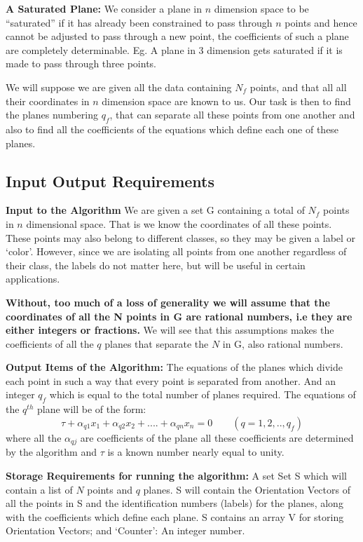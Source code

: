 \documentclass[english]{article}
\begin{document}
\textbf{A Saturated Plane:} We consider a plane in $n$ dimension
space to be {}``saturated'' if it has already been constrained to
pass through $n$ points and hence cannot be adjusted to pass through
a new point, the coefficients of such a plane are completely determinable.
Eg. A plane in 3 dimension gets saturated if it is made to pass through
three points.

We will suppose we are given all the data containing $N_{f}$ points, and that all 
all their coordinates in $n$ dimension space are known to us. Our task is then to find the planes numbering $q_f$, that can separate all these points from one another and also to find all the coefficients of the equations which define each one of these planes.

\subsection{Input Output Requirements}

\textbf{Input to the Algorithm} We are given a set G containing a
total of $N_{f}$ points in $n$ dimensional space. That is we know
the coordinates of all these points. These points may also belong
to different classes, so they may be given a label or `color'. However,
since we are isolating all points from one another regardless of their
class, the labels do not matter here, but will be useful in certain
applications.


\textbf{Without, too much of a loss of generality we will assume that the coordinates of all the N points in G are rational numbers, i.e they are either integers or fractions.} We will see that this assumptions makes the coefficients of  all the $q$ planes that separate the $N$ in G, also rational numbers. 

\textbf{Output Items of the Algorithm:} The equations of the planes
which divide each point in such a way that every point is separated
from another. And an integer $q_{f}$ which is equal to the
total number of planes required. The equations of the $q^{th}$ plane will be of the form:
\begin{equation}
\tau +\alpha_{q1}x_{1}+\alpha_{q2}x_{2}+....+\alpha_{qn}x_{n}=0\quad \quad (q= 1,2,..,q_f)
\end{equation}
 where all the $\alpha_{qj}$ are coefficients of the plane all these coefficients  are determined by the algorithm and  $\tau$ is a known number nearly equal to unity. 

\textbf{ Storage Requirements for running the algorithm:} A set Set
S which will contain a list of $N$ points and $q$ planes. S will contain the Orientation Vectors of all the points in S and the identification numbers (labels) for the planes, along with the coefficients which define each plane. S contains an array V for storing Orientation Vectors; and `Counter': An integer number. 
\end{document}

